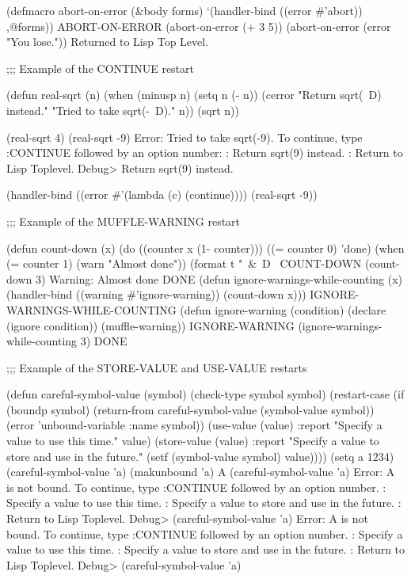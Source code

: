  (defmacro abort-on-error (&body forms)
   `(handler-bind ((error #'abort))
      ,@forms)) \EV ABORT-ON-ERROR
 (abort-on-error (+ 3 5)) 
 (abort-on-error (error "You lose."))
\OUT Returned to Lisp Top Level.

;;; Example of the CONTINUE restart

 (defun real-sqrt (n)
   (when (minusp n)
     (setq n (- n))
     (cerror "Return sqrt(~D) instead." "Tried to take sqrt(-~D)." n))
   (sqrt n))

 (real-sqrt 4) 
 (real-sqrt -9)
\OUT Error: Tried to take sqrt(-9).
\OUT To continue, type :CONTINUE followed by an option number:
: Return sqrt(9) instead.
: Return to Lisp Toplevel.
\OUT Debug> 
\OUT Return sqrt(9) instead.
 
 (handler-bind ((error #'(lambda (c) (continue))))
   (real-sqrt -9)) 

;;; Example of the MUFFLE-WARNING restart

 (defun count-down (x)
   (do ((counter x (1- counter)))
       ((= counter 0) 'done)
     (when (= counter 1)
       (warn "Almost done"))
     (format t "~&~D~%
\EV COUNT-DOWN
 (count-down 3)
\OUT Warning: Almost done
\EV DONE
 (defun ignore-warnings-while-counting (x)
   (handler-bind ((warning #'ignore-warning))
     (count-down x)))
\EV IGNORE-WARNINGS-WHILE-COUNTING
 (defun ignore-warning (condition)
   (declare (ignore condition))
   (muffle-warning))
\EV IGNORE-WARNING
 (ignore-warnings-while-counting 3)
\EV DONE

;;; Example of the STORE-VALUE and USE-VALUE restarts

 (defun careful-symbol-value (symbol)
   (check-type symbol symbol)
   (restart-case (if (boundp symbol)
                     (return-from careful-symbol-value 
                                  (symbol-value symbol))
                     (error 'unbound-variable
                            :name symbol))
     (use-value (value)
       :report "Specify a value to use this time."
       value)
     (store-value (value)
       :report "Specify a value to store and use in the future."
       (setf (symbol-value symbol) value))))
 (setq a 1234) 
 (careful-symbol-value 'a) 
 (makunbound 'a) \EV A
 (careful-symbol-value 'a)
\OUT Error: A is not bound.
\OUT To continue, type :CONTINUE followed by an option number.
: Specify a value to use this time.
: Specify a value to store and use in the future.
: Return to Lisp Toplevel.
\OUT Debug> 
 (careful-symbol-value 'a)
\OUT Error: A is not bound.
\OUT To continue, type :CONTINUE followed by an option number.
: Specify a value to use this time.
: Specify a value to store and use in the future.
: Return to Lisp Toplevel.
\OUT Debug> 
 (careful-symbol-value 'a)

